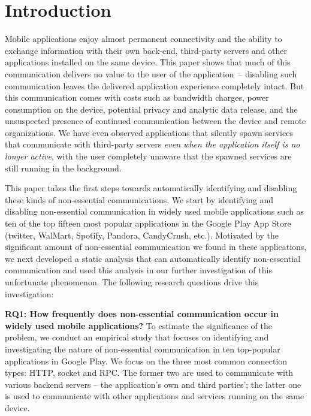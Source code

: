\section{Introduction}
\label{sec:intro} 

Mobile applications enjoy almost permanent connectivity and the
ability to exchange information with their own back-end, third-party
servers and other applications installed on the same device.  This
paper shows that much of this communication delivers no value to the
user of the application~-- disabling such communication leaves the
delivered application experience completely intact.  But this
communication comes with costs such as bandwidth charges, power
consumption on the device, potential privacy and analytic data
release, and the unsuspected presence of continued communication
between the device and remote organizations. We have even observed
applications that silently spawn services that communicate with
third-party servers {\em even when the application itself is no longer
active}, with the user completely unaware that the spawned services are
still running in the background.

This paper takes the first steps towards automatically identifying and
disabling these kinds of non-essential communications. We start by
identifying and disabling non-essential communication in 
widely used mobile applications such as ten of the top fifteen most
popular applications in the Google Play App Store (twitter, WalMart,
Spotify, Pandora, CandyCrush, etc.). Motivated by the significant
amount of non-essential communication we found in these applications, 
we next developed a static analysis that can automatically identify 
non-essential communication and used this analysis in our
further investigation of this unfortunate phenomenon. The following
research questions drive this investigation:

\vspace{0.1in}
\noindent 
{\bf RQ1: How frequently does non-essential communication occur in
  widely used mobile applications?}  To estimate the significance of
the problem, we conduct an empirical study that focuses on identifying
and investigating the nature of non-essential communication in ten
top-popular applications in Google Play.  We focus on the three most
common connection types: HTTP, socket and RPC.  The former two are
used to communicate with various backend servers -- the application's
own and third parties'; the latter one is used to communicate with
other applications and services running on the same device.

